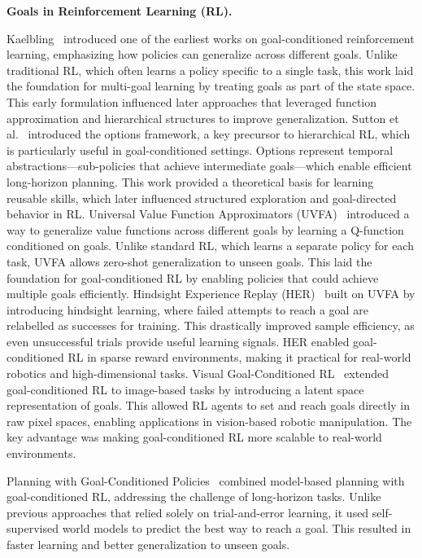 \textbf{Goals in Reinforcement Learning (RL).}

Kaelbling~\cite{kaelbling1993learning} introduced one of the earliest works on goal-conditioned reinforcement learning,
emphasizing how policies can generalize across different goals.
Unlike traditional RL, which often learns a policy specific to a single task, this work laid the foundation for
multi-goal learning by treating goals as part of the state space.
This early formulation influenced later approaches that leveraged function approximation and hierarchical structures to
improve generalization.
%
Sutton et al.~\cite{sutton1999between} introduced the options framework, a key precursor to hierarchical RL, which is
particularly useful in goal-conditioned settings.
Options represent temporal abstractions—sub-policies that achieve intermediate goals—which enable efficient
long-horizon planning.
This work provided a theoretical basis for learning reusable skills, which later influenced structured exploration and
goal-directed behavior in RL.
%
Universal Value Function Approximators (UVFA)~\cite{schaul2015universal} introduced a way to generalize value functions
across different goals by learning a Q-function conditioned on goals.
Unlike standard RL, which learns a separate policy for each task, UVFA allows zero-shot generalization to unseen goals.
This laid the foundation for goal-conditioned RL by enabling policies that could achieve multiple goals efficiently.
%
Hindsight Experience Replay (HER)~\cite{andrychowicz2017hindsight} built on UVFA by introducing hindsight learning,
where failed attempts to reach a goal are relabelled as successes for training.
This drastically improved sample efficiency, as even unsuccessful trials provide useful learning signals.
HER enabled goal-conditioned RL in sparse reward environments, making it practical for real-world robotics and
high-dimensional tasks.
%
Visual Goal-Conditioned RL~\cite{nair2018visual} extended goal-conditioned RL to image-based tasks by introducing a
latent space representation of goals.
This allowed RL agents to set and reach goals directly in raw pixel spaces, enabling applications in vision-based
robotic manipulation.
The key advantage was making goal-conditioned RL more scalable to real-world environments.

Planning with Goal-Conditioned Policies~\cite{nasiriany2019planning} combined model-based planning with goal-conditioned
RL, addressing the challenge of long-horizon tasks.
Unlike previous approaches that relied solely on trial-and-error learning, it used self-supervised world models to
predict the best way to reach a goal.
This resulted in faster learning and better generalization to unseen goals.

